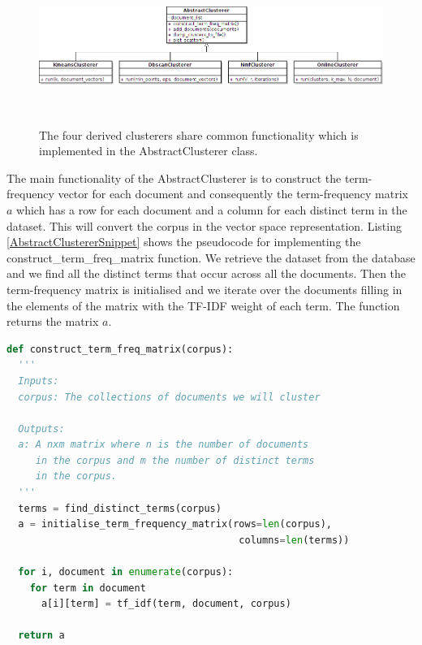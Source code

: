 \begin{figure}[htbp]
  \begin{center}
    \includegraphics[height=2.0in, width=6in]{clusterers-uml}
    \caption{The four derived clusterers share common functionality which is implemented in the AbstractClusterer class. }
    \label{UMLClusterers}
  \end{center}
\end{figure}    
 
The main functionality of the AbstractClusterer is to construct the term-frequency vector for each document and consequently the term-frequency matrix $a$ which has a row for each document and a column for each distinct term in the dataset. This will convert the corpus in the vector space representation. Listing \ref{AbstractClustererSnippet} shows the pseudocode for implementing the construct\_term\_freq\_matrix function. We retrieve the dataset from the database and we find all the distinct terms that occur across all the documents. Then the term-frequency matrix is initialised and we iterate over the documents filling in the elements of the matrix with the TF-IDF weight of each term. The function returns the matrix $a$.

\begin{lstlisting}[language=Python, label=AbstractClustererSnippet, caption=Pseudocode for constructing the term-frequency matrix for a dataset]
def construct_term_freq_matrix(corpus):
  '''
  Inputs: 
  corpus: The collections of documents we will cluster
  
  Outputs:
  a: A nxm matrix where n is the number of documents 
     in the corpus and m the number of distinct terms
     in the corpus.  
  '''
  terms = find_distinct_terms(corpus)
  a = initialise_term_frequency_matrix(rows=len(corpus), 
                                        columns=len(terms))
  
  for i, document in enumerate(corpus):
    for term in document
      a[i][term] = tf_idf(term, document, corpus)
    
  return a 
\end{lstlisting}

